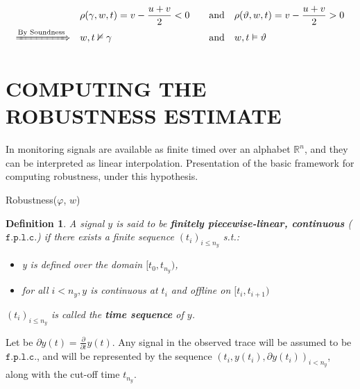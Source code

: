 \documentclass{suftesi}
\newtheorem*{definition}{Definition}
\renewcommand{\b}{\textbf}
\begin{document}
\begin{align*}
                                    &\quad\rho(\gamma, w, t) = v - \frac{u + v}{2} < 0      &\quad \text{and} \quad     & \rho(\vartheta, w, t) = v - \frac{u + v}{2} > 0 \\
\xRightarrow{\text{By Soundness}}   &\quad w, t \nvDash \gamma                              &\quad \text{and} \quad     & w, t \vDash \vartheta
\end{align*}

\section{COMPUTING THE ROBUSTNESS ESTIMATE}

In monitoring signals are available as finite timed over an alphabet $\mathbb{R}^n$, and they can be interpreted as linear interpolation. Presentation of the basic framework for computing robustness, under this hypothesis. 

\begin{algorithm}[H]
    \caption{Robustness($\varphi$, $w$)}
\end{algorithm}

\begin{definition}
    A signal $y$ is said to be \b{finitely piecewise-linear, continuous} ($\mathtt{f.p.l.c.}$) if there exists a finite sequence $(t_i)_{i\leq n_y}$ s.t.:
    \begin{itemize}[leftmargin=0.5cm]
        \item y is defined over the domain $[t_0,t_{n_y})$,
        \item for all $i<n_y,y$ is continuous at $t_i$ and offline on $[t_i,t_{i+1})$
    \end{itemize}
    $(t_i)_{i\leq n_y}$ is called the \b{time sequence} of $y$.
\end{definition}

Let be $\partial y(t)=\frac{\partial}{\partial t}y(t)$. Any signal in the observed trace will be assumed to be $\mathtt{f.p.l.c.}$, and will be represented by the sequence $(t_i,y(t_i),\partial y(t_i))_{i<n_y}$, along with the cut-off time $t_{n_y}$. 
\end{document}

